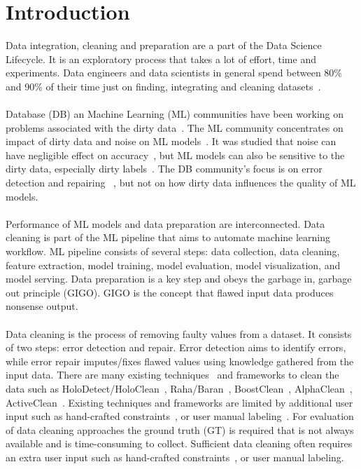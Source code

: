 \chapter{Introduction}
Data integration, cleaning and preparation are a part of the Data Science Lifecycle. It is an exploratory process that takes a lot of effort, time and experiments.
Data engineers and data scientists in general spend between 80\% and 90\% of their time just on finding, integrating and cleaning datasets~\cite{80cleansurvey, dataintegration80}.
\\\\
Database (DB) an Machine Learning (ML) communities have been working on problems associated with the dirty data~\cite{cleanml}. 
The ML community concentrates on impact of dirty data and noise on ML models~\cite{cleanml}. It was studied that noise can have negligible effect on accuracy~\cite{processingsys, outperformstudy}, but ML models can also be sensitive to the dirty data, especially dirty labels~\cite{classificationnoisesurvey}. The DB community's focus is on error detection and repairing ~\cite{Hellerstein08quantitativedata, duplicatesstudy}, but not on how dirty data influences the quality of ML models. 
\\\\
Performance of ML models and data preparation are interconnected. Data cleaning is part of the ML pipeline that aims to automate machine learning workflow. 
ML pipeline consists of several steps: data collection, data cleaning, feature extraction, model training, model evaluation, model visualization, and model serving.
Data preparation is a key step and obeys the garbage in, garbage out principle (GIGO). GIGO is the concept that flawed input data produces nonsense output.
\\\\
Data cleaning is the process of removing faulty values from a dataset. It consists of two steps: error detection and repair. Error detection aims to identify errors, while error repair imputes/fixes flawed values using knowledge gathered from the input data. 
There are many existing techniques~\cite{duplicatesstudy, tdeexcel} and frameworks to clean the data such as HoloDetect/HoloClean~\cite{holoclean, holodetect}, Raha/Baran~\cite{raha, baran}, BoostClean~\cite{boostclean}, AlphaClean~\cite{alphaclean}, ActiveClean~\cite{activeclean}. 
Existing techniques and frameworks are limited by additional user input such as hand-crafted constraints~\cite{bart}, or user manual labeling~\cite{raha, baran}. For evaluation of data cleaning approaches the ground truth (GT) is required that is not always available and is time-consuming to collect. Sufficient data cleaning often requires an extra user input such as hand-crafted constraints~\cite{bart}, or user manual labeling.
